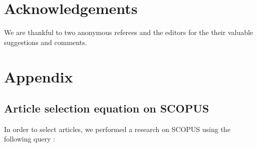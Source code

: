 \section*{Acknowledgements}
We are thankful to two anonymous referees and the editors for the their valuable suggestions and comments. 

\clearpage
{}
\setcounter{figure}{0}
\setcounter{table}{0}
\setcounter{equation}{0}
\renewcommand{\thesection}{\Alph{section}}
\renewcommand{\thesubsection}{\Alph{subsection}}
\renewcommand{\thefigure}{1.\Alph{figure}}
\renewcommand{\thetable}{1.\Alph{table}}

{}
\section*{Appendix}  %
\renewcommand\theequation{A.\arabic{equation}} %
\setcounter{equation}{0}
\onehalfspacing


\subsection{Article selection equation on SCOPUS}
\label{appendix:SCOPUS}
In order to select articles, we performed a research on SCOPUS using the following query : \\\\

